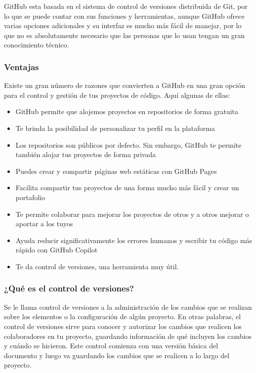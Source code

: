\documentclass[
]{article}
\providecommand{\tightlist}{%
  \setlength{\itemsep}{0pt}\setlength{\parskip}{0pt}}
\begin{document}
GitHub esta basada en el sistema de control de versiones distribuida de
Git, por lo que se puede contar con sus funciones y herramientas, aunque
GitHub ofrece varias opciones adicionales y su interfaz es mucho más
fácil de manejar, por lo que no es absolutamente necesario que las
personas que lo usan tengan un gran conocimiento técnico.

\hypertarget{ventajas}{%
\subsubsection{Ventajas}\label{ventajas}}

Existe un gran número de razones que convierten a GitHub en una gran
opción para el control y gestión de tus proyectos de código. Aquí
algunas de ellas:

\begin{itemize}
\tightlist
\item
  GitHub permite que alojemos proyectos en repositorios de forma
  gratuita
\item
  Te brinda la posibilidad de personalizar tu perfil en la plataforma
\item
  Los repositorios son públicos por defecto. Sin embargo, GitHub te
  permite también alojar tus proyectos de forma privada
\item
  Puedes crear y compartir páginas web estáticas con GitHub Pages
\item
  Facilita compartir tus proyectos de una forma mucho más fácil y crear
  un portafolio
\item
  Te permite colaborar para mejorar los proyectos de otros y a otros
  mejorar o aportar a los tuyos
\item
  Ayuda reducir significativamente los errores humanos y escribir tu
  código más rápido con GitHub Copilot
\item
  Te da control de versiones, una herramienta muy útil.
\end{itemize}

\hypertarget{quuxe9-es-el-control-de-versiones}{%
\subsubsection{¿Qué es el control de
versiones?}\label{quuxe9-es-el-control-de-versiones}}

Se le llama control de versiones a la administración de los cambios que
se realizan sobre los elementos o la configuración de algún proyecto. En
otras palabras, el control de versiones sirve para conocer y autorizar
los cambios que realicen los colaboradores en tu proyecto, guardando
información de qué incluyen los cambios y cuándo se hicieron. Este
control comienza con una versión básica del documento y luego va
guardando los cambios que se realicen a lo largo del proyecto.
\end{document}
